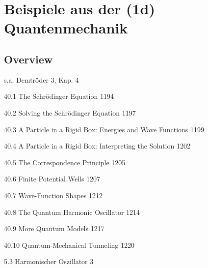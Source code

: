 \renewcommand{\lastmod}{10. September 2024}
\renewcommand{\chapterauthors}{Markus Lippitz}

\chapter{Beispiele aus der (1d) Quantenmechanik}






\section{Overview}

s.a. Demtröder 3, Kap. 4


40.1 The Schrödinger Equation 1194

40.2 Solving the Schrödinger Equation 1197

40.3 A Particle in a Rigid Box: Energies and Wave Functions 1199

40.4 A Particle in a Rigid Box: Interpreting the Solution 1202

40.5 The Correspondence Principle 1205


40.6 Finite Potential Wells 1207

40.7 Wave-Function Shapes 1212

40.8 The Quantum Harmonic Oscillator 1214

40.9 More Quantum Models 1217

40.10 Quantum-Mechanical Tunneling 1220


5.3 Harmonischer Oszillator 3	




